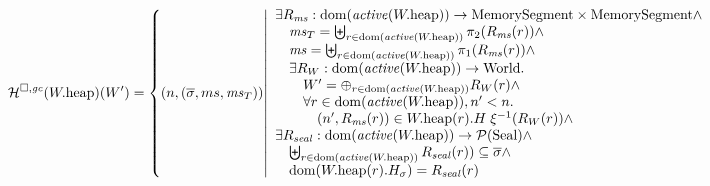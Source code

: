 \documentclass[a4paper]{article}
\begin{document}
\[
  \lrheap(\pwheap)(W') = 
  \left\{
    \npair{(\overline{\sigma},ms,\ms_T)} \middle|
    \begin{array}{l}
      \exists R_\ms : \dom(\activeReg{\pwheap}) \fun \MemSeg \times \MemSeg \wedge \\
      \quad \ms_T = \biguplus_{r \in \dom(\activeReg{\pwheap})} \pi_2(R_\ms(r)) \wedge \\
      \quad \ms = \biguplus_{r \in \dom(\activeReg{\pwheap})} \pi_1(R_\ms(r)) \wedge \\
      \quad \exists R_W : \dom(\activeReg{\pwheap}) \fun \World\ldotp\\
      \qquad W' = \oplus_{r \in \dom(\activeReg{\pwheap})} R_W(r) \wedge\\
      \qquad \forall r \in \dom(\activeReg{\pwheap}), n' < n \ldotp \\
      \qquad \quad \npair[n']{R_\ms(r)} \in  \pwheap(r).H \; \xi^{-1}(R_W(r)) \wedge\\
      \exists R_\var{seal} : \dom(\activeReg{\pwheap}) \fun \powerset{\Seal} \wedge\\
      \quad \biguplus_{r \in \dom(\activeReg{\pwheap})} R_\var{seal}(r)) \subseteq \overline{\sigma} \wedge\\
      \quad \dom(\pwheap(r).H_\sigma) = R_\var{seal}(r)
    \end{array}
  \right.
\]



\end{document}
